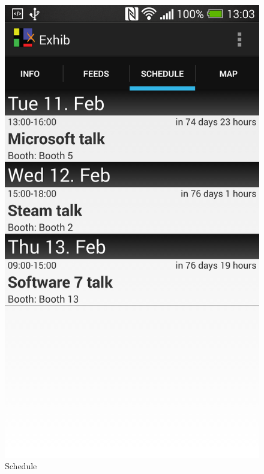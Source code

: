 \begin{figure}[H]
\begin{minipage}[b]{0.5\columnwidth}
\centering
\includegraphics[width=\columnwidth]{img/finaldesign/schedule.png}
\caption{Schedule}
\label{fig:schedule}
\end{minipage}
\hspace{0.5cm}
\begin{minipage}[b]{0.5\columnwidth}
\centering

\end{minipage}
\end{figure}
